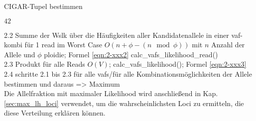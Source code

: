 \begin{algorithm}[H]
	\caption{CIGAR-Tupel bestimmen}  \label{alg:cig}
	\begin{algorithmic}[1]	
		\State $42$
		\EndFunction
	\end{algorithmic}
\end{algorithm}



2.2 Summe der Wslk über die Häufigkeiten aller Kandidatenallele in einer vaf-kombi für 1 read im Worst Case $O(n + \phi - (n \mod \phi))$ mit $n$ Anzahl der Allele und $\phi$ ploidie; Formel \eqref{eqn:2-xxx2} calc\_vafs\_likelihood\_read()\\ 

2.3 Produkt für alle Reads $O(V)$; calc\_vafs\_likelihood(); Formel \eqref{eqn:2-xxx3}\\ 

2.4 schritte 2.1 bis 2.3 für alle vafs/für alle Kombinationsmöglichkeiten der Allele bestimmen und daraus => Maximum \\
Die Allelfraktion mit maximaler Likelihood wird anschließend in Kap. \ref{sec:max_lh_loci} verwendet, um die wahrscheinlichsten Loci zu ermitteln, die diese Verteilung erklären können.

